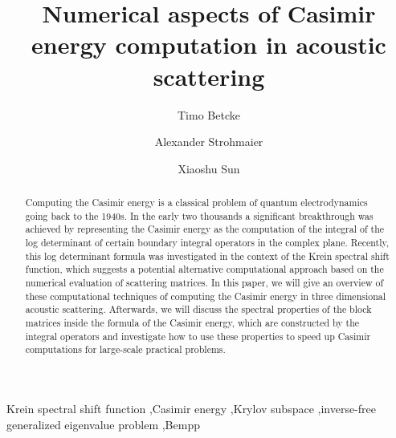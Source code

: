 \documentclass[review]{elsarticle}
\begin{document}
\begin{frontmatter}

\title{Numerical aspects of Casimir energy computation in acoustic scattering}

\author[mymainaddress]{Timo Betcke}
\address[mymainaddress]{Department of Mathematics, University College London, London, WC1E 6BT, UK}


\author[mysecondaryaddress]{Alexander Strohmaier}
\address[mysecondaryaddress]{School of Mathematics, University of Leeds, Leeds, LS2 9JT, UK}

\author[mymainaddress]{Xiaoshu Sun}



\begin{abstract}
    Computing the Casimir energy is a classical problem of quantum electrodynamics going back to the 1940s. In the early two thousands a significant breakthrough
     was achieved by representing the Casimir energy as the computation of the integral of the log determinant of certain boundary integral operators in the complex plane. 
Recently, this log determinant formula was investigated in the context of the Krein spectral shift function, which suggests a potential alternative computational 
approach based on the numerical evaluation of scattering matrices. In this paper, we will give an overview of these computational techniques of computing 
the Casimir energy in three dimensional acoustic scattering. Afterwards, we will discuss the spectral properties of the block matrices 
inside the formula of the Casimir energy, which are constructed by the integral operators and investigate how to use these properties to speed up Casimir computations for large-scale practical problems.
\end{abstract}

\begin{keyword}
Krein spectral shift function \sep Casimir energy \sep Krylov subspace \sep inverse-free generalized eigenvalue problem \sep Bempp
\end{keyword}

\end{frontmatter}
\end{document}
